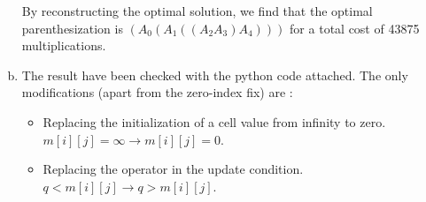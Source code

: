 \documentclass[a4paper, 10pt, twoside]{article}
\begin{document}
\begin{enumerate}[a)]
	      By reconstructing the optimal solution, we find that the optimal parenthesization is $(A_0(A_1((A_2A_3)A_4)))$ for a total cost of 43875 multiplications.

	\item The result have been checked with the python code attached. The only modifications (apart from the zero-index fix) are :

	      \begin{itemize}
		      \item Replacing the initialization of a cell value from infinity to zero. $m[i][j] = \infty \rightarrow m[i][j] = 0$.
		      \item Replacing the operator in the update condition. $q < m[i][j] \rightarrow q > m[i][j]$.
	      \end{itemize}

\end{enumerate}
\end{document}
